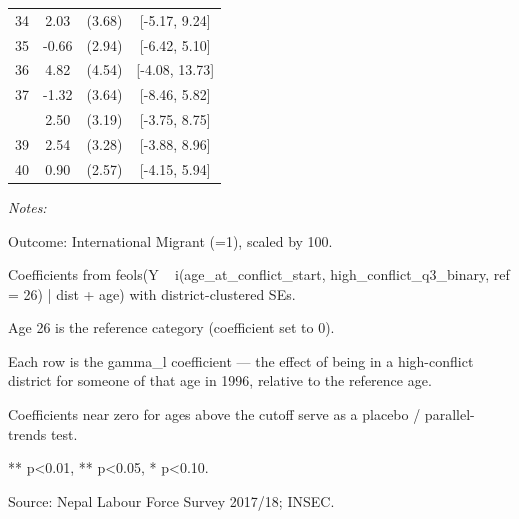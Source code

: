 \begin{table}[!h]
\begin{threeparttable}
\begin{tabular}[t]{cccc}
34 & 2.03 & (3.68) & {}[-5.17, 9.24]\\
35 & -0.66 & (2.94) & {}[-6.42, 5.10]\\
36 & 4.82 & (4.54) & {}[-4.08, 13.73]\\
37 & -1.32 & (3.64) & {}[-8.46, 5.82]\\
\addlinespace
38 & 2.50 & (3.19) & {}[-3.75, 8.75]\\
39 & 2.54 & (3.28) & {}[-3.88, 8.96]\\
40 & 0.90 & (2.57) & {}[-4.15, 5.94]\\
\bottomrule
\end{tabular}
\begin{tablenotes}
\item \textit{Notes:} 
\item Outcome: International Migrant (=1), scaled by 100.
\item Coefficients from feols(Y ~ i(age_at_conflict_start, high_conflict_q3_binary, ref = 26) | dist + age) with district-clustered SEs.
\item Age 26 is the reference category (coefficient set to 0).
\item Each row is the gamma_l coefficient — the effect of being in a high-conflict district for someone of that age in 1996, relative to the reference age.
\item Coefficients near zero for ages above the cutoff serve as a placebo / parallel-trends test.
\item *** p<0.01, ** p<0.05, * p<0.10.
\item Source: Nepal Labour Force Survey 2017/18; INSEC.
\end{tablenotes}
\end{threeparttable}
\end{table}
